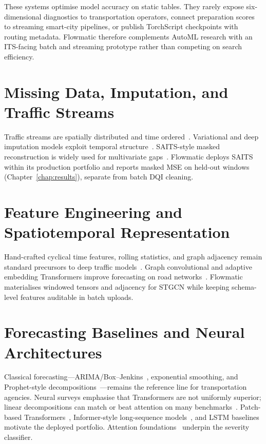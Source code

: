 These systems optimise model accuracy on static tables. They rarely expose six-dimensional diagnostics to transportation operators, connect preparation scores to streaming smart-city pipelines, or publish TorchScript checkpoints with routing metadata. Flowmatic therefore complements AutoML research with an ITS-facing batch and streaming prototype rather than competing on search efficiency.

\section{Missing Data, Imputation, and Traffic Streams}

Traffic streams are spatially distributed and time ordered~\cite{tang2024missing,chan2023missing}. Variational and deep imputation models exploit temporal structure~\cite{boquet2020vae}. SAITS-style masked reconstruction is widely used for multivariate gaps~\cite{chan2023missing}. Flowmatic deploys SAITS within its production portfolio and reports masked MSE on held-out windows (Chapter~\ref{chap:results}), separate from batch DQI cleaning.

\section{Feature Engineering and Spatiotemporal Representation}

Hand-crafted cyclical time features, rolling statistics, and graph adjacency remain standard precursors to deep traffic models~\cite{cai2022feature,luo2024spatiotemporal,wu2021graph,mu2024spatiotemporal}. Graph convolutional and adaptive embedding Transformers improve forecasting on road networks~\cite{yu2018stgcn,guo2019attention,liu2023transformer,yan2021dynamic,wang2023adaptive}. Flowmatic materialises windowed tensors and adjacency for STGCN while keeping schema-level features auditable in batch uploads.

\section{Forecasting Baselines and Neural Architectures}

Classical forecasting---ARIMA/Box--Jenkins~\cite{box2015time}, exponential smoothing, and Prophet-style decompositions~\cite{taylor2018forecasting,hyndman2021forecasting}---remains the reference line for transportation agencies. Neural surveys emphasise that Transformers are not uniformly superior; linear decompositions can match or beat attention on many benchmarks~\cite{zeng2023transformers,benidis2022neural}. Patch-based Transformers~\cite{nie2023patchtst}, Informer-style long-sequence models~\cite{zhou2021informer}, and LSTM baselines~\cite{hochreiter1997lstm} motivate the deployed portfolio. Attention foundations~\cite{vaswani2017attention} underpin the severity classifier.

